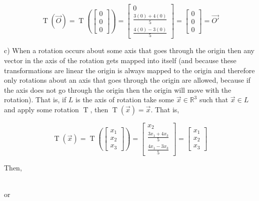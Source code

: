 \documentclass[12pt, letterpaper]{article}
\newcommand{\R}{\mathbb{R}}
\theoremstyle{statement}
\theoremstyle{statement}
\begin{document}
    $$
    \operatorname{T}(\Vec{O})
    =\operatorname{T}\left(\begin{bmatrix}
                        0 \\0 \\0
                        \end{bmatrix}\right)
    =\begin{bmatrix}
    0\\
    \frac{3(0)+4(0)}{5}\\
    \frac{4(0)-3(0)}{5}
    \end{bmatrix}
    =\begin{bmatrix}
    0\\
    0\\
    0
    \end{bmatrix}
    =\Vec{O'}
    $$
    
    c) When a rotation occurs about some axis that goes through the origin then any vector in the axis of the rotation gets mapped into itself (and because these transformations are linear the origin is always mapped to the origin and therefore only rotations about an axis that goes through the origin are allowed, because if the axis does not go through the origin then the origin will move with the rotation). That is, if $L$ is the axis of rotation take some $\Vec{x}\in\R^3$ such that $\Vec{x}\in L$ and apply some rotation $\operatorname{T}$, then $\operatorname{T}(\Vec{x})=\Vec{x}$. That is,
    
    $$
    \operatorname{T}(\Vec{x})
    =\operatorname{T}\left(\begin{bmatrix} x_1\\x_2\\x_3\end{bmatrix}\right)
    =
    \begin{bmatrix}
    x_2 \\
    \frac{3x_1+4x_3}{5}\\
    \frac{4x_1-3x_3}{5}
    \end{bmatrix}
    =\begin{bmatrix}
    x_1\\x_2\\x_3
    \end{bmatrix}
    $$
    
    Then,
    
    \\
    
    
    or\\
    
\end{document}
